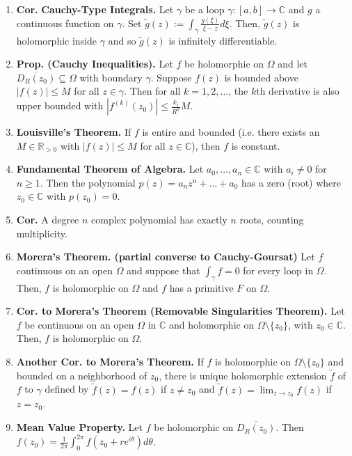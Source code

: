 \documentclass[12pt]{article}
\theoremstyle{definition}
\theoremstyle{named}
\begin{document}
{\begin{multicols}{2}
\begin{spacing}{1.01}
\begin{enumerate}
    $$
    f^{(n)}(z_0) = \frac{n}{2\pi i} \int_\gamma \frac{f(\xi)}{(\xi - z_0)^{n+1}} d\xi. 
    $$
    \item \textbf{Cor. } \textbf{Cauchy-Type Integrals. } Let $\gamma$ be a loop $\gamma: [a,b] \to \mathbb{C}$ and $g$ a continuous function on $\gamma$. Set $\tilde{g}(z) := \int_\gamma \frac{g(\xi)}{\xi - z} d\xi$. Then, $\tilde{g}(z)$ is holomorphic inside $\gamma$ and so $\tilde{g}(z)$ is infinitely differentiable. 
    \item \textbf{Prop. (Cauchy Inequalities). } Let $f$ be holomorphic on $\Omega$ and let $\overline{D_R(z_0)} \subseteq \Omega$ with boundary $\gamma$. Suppose $f(z)$ is bounded above $|f(z)| \leq M$ for all $z \in \gamma$. Then for all $k=1,2,\dots$, the $k$th derivative is also upper bounded with $|f^{(k)}(z_0)| \leq \frac{k_i}{R^k}M$. 
    \item \textbf{Louisville's Theorem. } If $f$ is entire and bounded (i.e. there exists an $M \in \mathbb{R}_{>0}$ with $|f(z)| \leq M$ for all $z \in \mathbb{C}$), then $f$ is constant. 
    \item \textbf{Fundamental Theorem of Algebra. } Let $a_0,\dots,a_n \in \mathbb{C}$ with $a_i \neq 0$ for $n \geq 1$. Then the polynomial $p(z) = a_nz^n + \dots + a_0$ has a zero (root) where $z_0 \in \mathbb{C}$ with $p(z_0) = 0$. 
    \item \textbf{Cor. } A degree $n$ complex polynomial has exactly $n$ roots, counting multiplicity. 
    \item \textbf{Morera's Theorem. (partial converse to Cauchy-Goursat)} Let $f$ continuous on an open $\Omega$ and suppose that $\int_\gamma f = 0$ for every loop in $\Omega$. Then, $f$ is holomorphic on $\Omega$ and $f$ has a primitive $F$ on $\Omega$. 
    \item \textbf{Cor. to Morera's Theorem (Removable Singularities Theorem). } Let $f$ be continuous on an open $\Omega$ in $\mathbb{C}$ and holomorphic on $\Omega \setminus \{z_0\}$, with $z_0 \in \mathbb{C}$. Then, $f$ is holomorphic on $\Omega$. 
    \item \textbf{Another Cor. to Morera's Theorem. } If $f$ is holomorphic on $\Omega \setminus \{z_0\}$ and bounded on a neighborhood of $z_0$, there is unique holomorphic extension $\tilde{f}$ of $f$ to $\gamma$ defined by $\tilde{f}(z) = f(z)$ if $z \neq z_0$ and $\tilde{f}(z) = \lim_{z \to z_0} f(z)$ if $z = z_0$. 
    \item \textbf{Mean Value Property. } Let $f$ be holomorphic on $\overline{D_R(z_0)}$. Then $f(z_0) = \frac{1}{2\pi} \int_{0}^{2\pi} f(z_0 + re^{i\theta}) d\theta$. 

\end{enumerate}
\end{spacing}
\end{multicols}}
\end{document}
